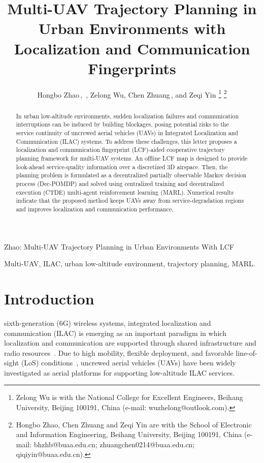 \documentclass[10pt,journal,letterpaper]{IEEEtran}
\begin{document}
\title{Multi-UAV Trajectory Planning in Urban Environments with Localization and Communication Fingerprints}

\author{Hongbo Zhao\,,~,
Zelong Wu, Chen Zhuang\,, and Zeqi Yin
\thanks{Zelong Wu is with the National College for Excellent Engineers,
Beihang University, Beijing 100191, China (e-mail: wuzhelong@outlook.com).}
\thanks{Hongbo Zhao, Chen Zhuang and Zeqi Yin are with the School
of Electronic and Information Engineering, Beihang University, Beijing
100191, China (e-mail: bhzhb@buaa.edu.cn; zhuangchen0214@buaa.edu.cn;
qiqiyin@buaa.edu.cn).}}

%
{Zhao: Multi-UAV Trajectory Planning in Urban Environments With LCF}

\maketitle

\begin{abstract}
In urban low-altitude environments, sudden localization failures and communication interruptions can be induced by building blockages, posing potential risks to the service continuity of uncrewed aerial vehicles (UAVs) in Integrated Localization and Communication (ILAC) systems. To address these challenges, this letter proposes a localization and communication fingerprint (LCF)-aided cooperative trajectory planning framework for multi-UAV systems. An offline LCF map is designed to provide look-ahead service-quality information over a discretized 3D airspace. Then, the planning problem is formulated as a decentralized partially observable Markov decision process (Dec-POMDP) and solved using centralized training and decentralized execution (CTDE) multi-agent reinforcement learning (MARL). Numerical results indicate that the proposed method keeps UAVs away from service-degradation regions and improves localization and communication performance.
\end{abstract}

\begin{IEEEkeywords}
Multi-UAV, ILAC, urban low-altitude environment, trajectory planning, MARL.
\end{IEEEkeywords}

\section{Introduction}
 sixth-generation (6G) wireless systems, integrated localization and communication (ILAC) is emerging as an important paradigm in which localization and communication are supported through shared infrastructure and radio resources~\cite{ref1}. Due to high mobility, flexible deployment, and favorable line-of-sight (LoS) conditions~\cite{ref2,ref3,ref4}, uncrewed aerial vehicles (UAVs) have been widely investigated as aerial platforms for supporting low-altitude ILAC services.
\end{document}
